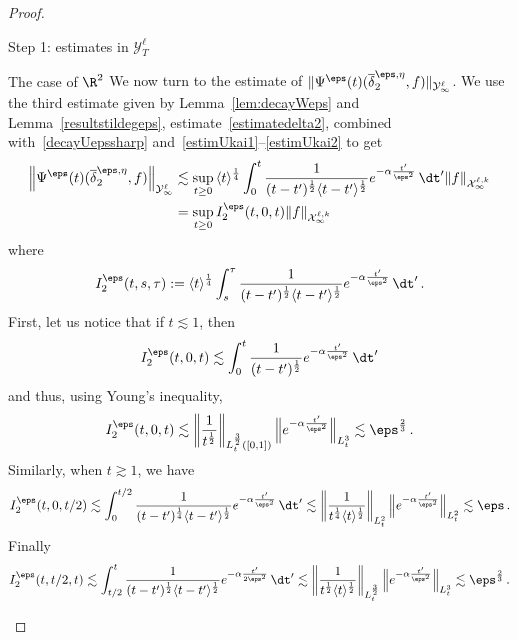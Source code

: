 \begin{proof}
\begin{step}{Step 1: estimates in $\mathcal{Y}^\ell_T$}
\begin{step}{The case of $\R^2$}
We now turn to the estimate of $\|\Psi^\eps(t) (\overline \delta^{\eps,\eta}_2, f)\|_{\mathcal{Y}^\ell_\infty}$. We use the third estimate given by Lemma~\ref{lem:decayWeps} and Lemma~\ref{resultstildegeps}, estimate~\eqref{estimatedelta2}, combined with~\eqref{decayUepssharp} and~\eqref{estimUkai1}--\eqref{estimUkai2} to get
\begin{align*}
\left\|\Psi^\eps(t) (\overline \delta^{\eps,\eta}_2, f)\right\|_{\mathcal{Y}^\ell_\infty} &\lesssim \sup_{t \ge 0} \, \langle t \rangle^\frac{1}{4} \int_0^t \frac{1}{{(t-t')^\frac{1}{2} \langle t-t'\rangle^\frac{1}{2}}} e^{- \alpha \frac{t'}{\eps^2}} \, \dt' \|f\|_{\mathcal{X}^{\ell,k}_\infty}\\&= \sup_{t \ge 0} I_2^\eps(t,0,t) \|f\|_{\mathcal{X}^{\ell,k}_\infty}
\end{align*}
where
\[
I_2^\eps(t,s,\tau) := \langle t \rangle^\frac{1}{4} \int_s^\tau \frac{1}{{(t-t')^\frac{1}{2} \langle t-t'\rangle^\frac{1}{2}}} e^{- \alpha \frac{t'}{\eps^2}} \, \dt' \,.
\]
First, let us notice that if $t \lesssim 1$, then
\[
I_2^\eps(t,0,t) \lesssim \int_0^t \frac{1}{(t-t')^\frac{1}{2}} e^{- \alpha \frac{t'}{\eps^2}} \, \dt'
\]
and thus, using Young's inequality,
\[
I_2^\eps(t,0,t) \lesssim \left\| \frac{1}{t^{\frac12}}\right\|_{L^{\frac32}_t([0,1])}\Big\|e^{- \alpha \frac{t'}{\eps^2}}\Big\|_{L^3_t} \lesssim \eps^{\frac23} \,.
\]
Similarly, when $t \gtrsim 1$, we have
\[
I_2^\eps(t,0,t/2) \lesssim \int_0^{t/2} \frac{1}{{(t-t')^\frac{1}{4} \langle t-t'\rangle^\frac{1}{2}}} e^{-\alpha \frac{t'}{\eps^2}} \, \dt'
\lesssim \left\| \frac{1}{{t^{\frac14} \langle t \rangle^{\frac12}}}\right\|_{L^{2}_t}\Big\|e^{- \alpha \frac{t'}{\eps^2}}\Big\|_{L^2_t} \lesssim \eps \,.
\]
Finally
\[
I_2^\eps(t,t/2,t) \lesssim \int_{t/2}^t \frac{1}{{(t-t')^\frac{1}{2} \langle t-t'\rangle^\frac{1}{2}}} e^{-\alpha \frac{t'}{{2\eps^2}}} \, \dt'
\lesssim \left\| \frac{1}{{t^{\frac12} \langle t \rangle^{\frac12}}}\right\|_{L^{\frac32}_t}\Big\|e^{-\alpha \frac{t'}{\eps^2}}\Big\|_{L^3_t} \lesssim \eps^{\frac23} \,.
\]
\end{step}


\end{step}
\end{proof}
